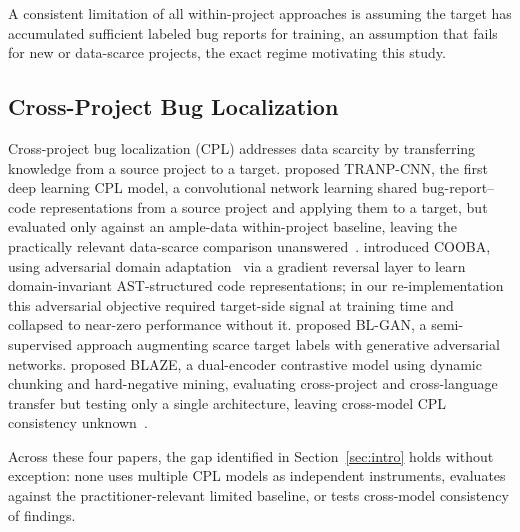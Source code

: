 \documentclass[a4paper,fleqn]{cas-dc}
\begin{document}
A consistent limitation of all within-project approaches is assuming the
target has accumulated sufficient labeled bug reports for training, an
assumption that fails for new or data-scarce projects, the exact regime
motivating this study.

\subsection{Cross-Project Bug Localization}

Cross-project bug localization (CPL) addresses data scarcity by
transferring knowledge from a source project to a target. \citet{huo2019deep}
proposed TRANP-CNN, the first deep learning CPL model, a convolutional
network learning shared bug-report--code representations from a source
project and applying them to a target, but evaluated only against an
ample-data within-project baseline, leaving the practically relevant
data-scarce comparison unanswered~\citep{zhu2021trobo}. \citet{zhu2020cooba}
introduced COOBA, using adversarial domain adaptation~\citep{ganin2016domain}
via a gradient reversal layer to learn domain-invariant AST-structured code
representations; in our re-implementation this adversarial objective
required target-side signal at training time and collapsed to near-zero
performance without it. \citet{zhu2022bl} proposed BL-GAN, a
semi-supervised approach augmenting scarce target labels with generative
adversarial networks.
\citet{chakraborty2025blaze} proposed BLAZE, a dual-encoder contrastive
model using dynamic chunking and hard-negative mining, evaluating
cross-project and cross-language transfer but testing only a single
architecture, leaving cross-model CPL consistency
unknown~\citep{chandramohan2024supporting,li2025knowledge,reddy2025swerank}.

 Across these four papers, the gap identified in
Section~\ref{sec:intro} holds without exception: none uses multiple CPL
models as independent instruments, evaluates against the
practitioner-relevant limited baseline, or tests cross-model consistency of
findings.
\end{document}
